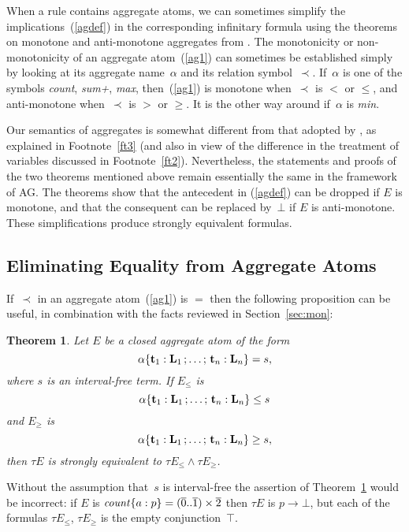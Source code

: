 \documentclass{tlp}
\def\rar{\rightarrow}
\newtheorem{theorem}{Theorem}
\begin{document}
When a rule contains aggregate atoms, we can sometimes simplify the
implications~(\ref{agdef}) in the corresponding infinitary formula using
the theorems on monotone and anti-monotone aggregates from
 \citeyear[Section~6.1]{har14a}.
The monotonicity or non-monotonicity of an
aggregate atom~(\ref{ag1}) can sometimes be established simply by looking
at its aggregate name~$\alpha$ and its relation symbol~$\prec$.  If~$\alpha$
is one of the symbols {\it count}, {\it sum+}, {\it max}, then~(\ref{ag1}) is
monotone when~$\prec$ is $<$ or $\leq$, and anti-monotone when~$\prec$ is
$>$ or $\geq$.  It is the other way around if~$\alpha$ is {\it min}.

Our semantics of aggregates is somewhat different from that adopted
by  \citeyear[Section~3.5]{har14a}, as explained in 
Footnote~\ref{ft3} (and also
in view of the difference in the treatment of variables discussed in
Footnote~\ref{ft2}).  Nevertheless, the statements and proofs of the two 
theorems mentioned above remain essentially the same in the framework of AG. The
theorems show that the antecedent in (\ref{agdef}) can be dropped if $E$
is monotone, and that the consequent can be replaced by~$\bot$ if $E$ is
anti-monotone.  These simplifications produce strongly equivalent
formulas.

\subsection{Eliminating Equality from Aggregate Atoms}

If~$\prec$ in an aggregate atom~(\ref{ag1}) is $=$ then the following
proposition can be useful, in combination with the facts reviewed in
Section~\ref{sec:mon}:

\begin{theorem}\label{lem:equality}
Let $E$ be a closed aggregate atom of the form
$$
\alpha\{{\bf t}_1 : {\bf L}_1\,;\ldots;\,{\bf t}_n : {\bf L}_n\}= s,
$$
where $s$ is an interval-free term.  If $E_{\le}$ is 
$$
\alpha\{{\bf t}_1 : {\bf L}_1\,;\ldots;\,{\bf t}_n : {\bf L}_n\} \leq s
$$
and $E_{\ge}$ is 
$$ 
\alpha\{{\bf t}_1 : {\bf L}_1\,;\ldots;\,{\bf t}_n : {\bf L}_n\} \geq s,
$$
then $\tau E$ is strongly equivalent to $\tau E_{\le} \land 
\tau E_{\ge}$.
\end{theorem}

Without the assumption that~$s$
is interval-free the assertion of Theorem~\ref{lem:equality} would be
incorrect:
if $E$ is ${\it count}\{a:p\} = (\overline 0..\overline 1)\times \overline 2$ then
$\tau E$ is $p \rar \bot$, but each of the formulas $\tau E_{\leq}$,
$\tau E_{\geq}$  is the empty conjunction~$\top$.  
\end{document}
